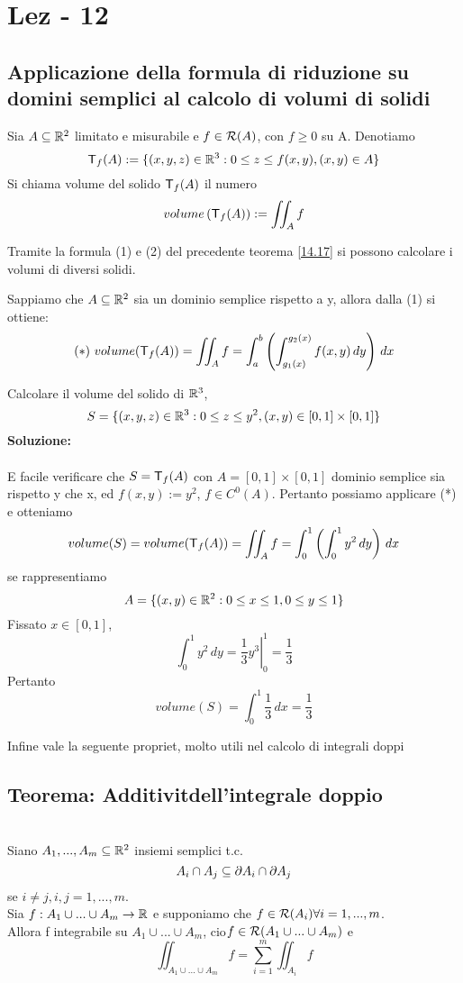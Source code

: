 \section{Lez - 12}
\subsection{Applicazione della formula di riduzione su domini semplici al calcolo di volumi di solidi}
\begin{definition}
  Sia $A \subseteq \mathbb{R}^2$ limitato e misurabile e $f\in\mathcal{R}(A)$, con $f\geq 0$ su A. Denotiamo 
  $$\mathsf{T}_{f}(A) := \{(x,y,z)\in\mathbb{R}^3: 0 \leq z \leq f(x,y), (x,y)\in A\}$$
  Si chiama volume del solido $\mathsf{T}_{f}(A)$ il numero 
  $$volume\left(\mathsf{T}_{f}(A)\right):= \iint_{A} f$$
\end{definition}
Tramite la formula (1) e (2) del precedente teorema \ref{14.17} si possono calcolare i volumi di diversi solidi.
\begin{example}
  Sappiamo che $A \subseteq \mathbb{R}^2$ sia un dominio semplice rispetto a y, allora dalla (1) si ottiene:
  $$(*) \text{ } volume(\mathsf{T}_{f}(A))=\iint_{A}f = \int_{a}^{b}\left(\int_{g_1(x)}^{g_2(x)}f(x,y)\,dy \right) \, dx$$
\end{example}
\begin{exercise}
  Calcolare il volume del solido di $\mathbb{R}^3$, $$S = \{(x,y,z)\in \mathbb{R}^3: 0 \leq z \leq y^2, (x,y)\in [0,1]\times[0,1]\}$$
  \textbf{Soluzione:}\\\\
  \ac{E} facile verificare che $S = \mathsf{T}_{f}(A)$ con $A = [0,1]\times[0,1]$ dominio semplice sia rispetto y che x, ed 
  $f(x,y):= y^2$, $f \in C^0(A)$. Pertanto possiamo applicare (*) e otteniamo
  $$volume(S) = volume(\mathsf{T}_{f}(A)) = \iint_{A}f = \int_{0}^{1}\left(\int_{0}^{1}y^2 \,dy\right)\, dx$$
  se rappresentiamo 
  $$A = \{(x,y)\in \mathbb{R}^2 : 0 \leq x \leq 1, 0 \leq y \leq 1\}$$
  Fissato $x \in [0,1]$, 
  $$\int_{0}^{1} y^2 \, dy = \left.\frac{1}{3}y^3 \right|_{0}^{1} = \frac{1}{3}$$
  Pertanto $$volume(S) = \int_{0}^{1} \frac{1}{3}\,dx = \frac{1}{3}$$
\end{exercise}
Infine vale la seguente propriet\aca, molto utili nel calcolo di integrali doppi
\subsection{Teorema: Additivit\aca dell'integrale doppio}
\begin{theorem} \\
  Siano $A_1,...,A_m \subseteq \mathbb{R}^2$ insiemi semplici t.c.
  $$A_i \cap A_j \subseteq \partial A_i \cap \partial A_j$$ se $i\neq j, i, j = 1,...,m$. \\
  Sia $f:A_1\cup...\cup A_m \to \mathbb{R}$ e supponiamo che $f \in \mathcal{R}(A_i) \forall i = 1,..., m$. \\
  Allora f \ace integrabile su $A_1\cup...\cup A_m$, cio\ace $f \in \mathcal{R}(A_1\cup...\cup A_m)$ e 
  $$\iint_{A_1\cup...\cup A_m} f = \sum_{i=1}^{m} \iint_{A_i}f$$ 
\end{theorem}

